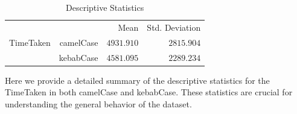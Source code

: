 \documentclass{article}
\begin{document}
\begin{table}[h]
	\centering
	\caption{Descriptive Statistics}
	\label{tab:descriptiveStatistics}
	{
		\begin{tabular}{lrrr}
			\toprule
			 &  & Mean & Std. Deviation  \\
			\cmidrule[0.4pt]{1-4}
			TimeTaken & camelCase & $4931.910$ & $2815.904$  \\
			 & kebabCase & $4581.095$ & $2289.234$  \\
			\bottomrule
		\end{tabular}
	}
\end{table}

Here we provide a detailed summary of the descriptive statistics for the TimeTaken in both camelCase and kebabCase. These statistics are crucial for understanding the general behavior of the dataset.
\end{document}
